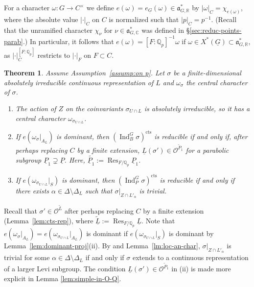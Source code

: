 \documentclass[a4paper]{amsart}
\numberwithin{equation}{section}
\newtheorem{thm}{Theorem}[section]
\theoremstyle{remark}
\theoremstyle{definition}
\DeclareMathOperator{\Ind}{Ind}
\DeclareMathOperator{\Res}{Res}
\newcommand{\C}{\mathbb{C}}
\newcommand{\Q}{\mathbb{Q}}
\newcommand{\R}{\mathbb{R}}
\newcommand{\alggrp}[1]{\underline{#1}}
\newcommand{\cts}{\mathrm{cts}}
\newcommand{\wt}[1]{\widetilde{#1}}
\begin{document}
For a character $\omega\colon G\to C^{\times}$ we define $e(\omega) = e_{\alggrp{G}}(\omega)\in \mathfrak{a}_{G,\R}^{*}$ by $\lvert\omega\rvert_{C} = \chi_{e(\omega)}$, where the absolute value $\lvert\cdot\rvert_C$ on $C$ is normalized such that $\lvert p\rvert_C = p^{-1}$.
(Recall that the unramified character $\chi_\nu$ for $\nu \in \mathfrak{a}_{G,\C}^{*}$ was defined in \S\ref{sec:reduc-points-parab}.)
In particular, it follows that $e(\omega) = [F:\Q_p]^{-1} \omega$ if $\omega \in X^*(\alggrp G) \subset \mathfrak{a}_{G,\R}^{*}$, as $\lvert\cdot\rvert_C^{[F:\Q_p]}$ restricts to $\lvert\cdot\rvert_F$ on $F \subset C$.

\begin{thm}\label{thm:unitary case}
  Assume Assumption~\ref{assump:on p}.
  Let $\sigma$ be a finite-dimensional absolutely irreducible continuous representation of $L$ and $\omega_{\sigma}$ the central character of $\sigma$.
  \begin{enumerate}
  \item The action of $Z$ on the coinvariants $\sigma_{U\cap L}$ is absolutely irreducible, so it has a central character $\omega_{\sigma_{U\cap L}}$. 
  \item If $e(\omega_{\sigma}|_{A_{L}})$ is dominant, then $(\Ind_{B}^{G}\sigma)^{\cts}$ is reducible if and only if, after perhaps replacing $C$ by a finite extension, $\underline L(\sigma')\in \mathcal{O}^{\wt{P}_{1}}$ for a parabolic subgroup $\alggrp{P}_{1}\supsetneq \alggrp{P}$.
    Here, $\wt{\alggrp P_1} := \Res_{F/\Q_p} \alggrp P_1$.
  \item     If $e(\omega_{\sigma_{U \cap L}}|_{S})$ is dominant, then $(\Ind_{P}^{G}\sigma)^{\cts}$ is reducible if and only if there exists $\alpha \in \Delta \setminus \Delta_L$ such that $\sigma|_{Z \cap L'_{\alpha}}$ is trivial.
  \end{enumerate}
\end{thm}

Recall that $\sigma' \in \mathcal O^{\wt L}$ after perhaps replacing $C$ by a finite extension (Lemma~\ref{lem:cts-rep}), where $\wt{\alggrp L} := \Res_{F/\Q_p} \alggrp L$.
Note that $e(\omega_{\sigma}|_{A_{L}}) = e(\omega_{\sigma_{U\cap L}}|_{A_{L}})$ is dominant if $e(\omega_{\sigma_{U\cap L}}|_S)$ is dominant by Lemma~\ref{lem:dominant-proj}(ii).
By \cite[II.7 Proposition]{AHHV} and Lemma~\ref{lm:loc-an-char}, $\sigma|_{Z \cap L'_{\alpha}}$ is trivial for some $\alpha \in \Delta \setminus \Delta_L$ if and only if $\sigma$ extends to a continuous representation of a larger Levi subgroup.
The condition $\underline L(\sigma')\in \mathcal{O}^{\wt P_{1}}$ in (ii) is made more explicit in Lemma \ref{lem:simple-in-O-Q}.
\end{document}
